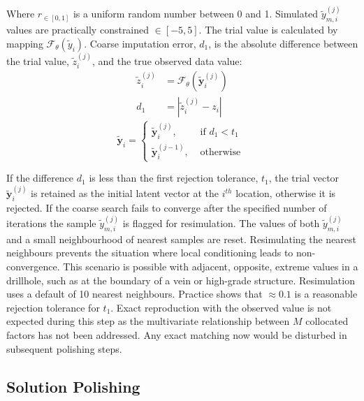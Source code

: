 Where $r_{\in[0,1]}$ is a uniform random number between 0 and 1. Simulated $\tilde{y}_{m, i}^{(j)}$ values are practically constrained $\in[-5, 5]$. The trial value is calculated by mapping $\mathcal{F}_{\theta}(\tilde{y}_{i})$. Coarse imputation error, $d_{1}$, is the absolute difference between the trial value, $\tilde{z}_{i}^{(j)}$, and the true observed data value:
\begin{align}
    \tilde{z}_{i}^{(j)} & = \mathcal{F}_{\theta}(\tilde{\mathbf{y}}_{i}^{(j)}) \\
    d_{1}               & = |\tilde{z}_{i}^{(j)} - z_{i}|
\end{align}
\begin{equation}
    \tilde{\mathbf{y}}_{i} =
    \begin{cases}
        \tilde{\mathbf{y}}_{i}^{(j)},   & \text{ if }d_{1} < t_{1} \\
        \tilde{\mathbf{y}}_{i}^{(j-1)}, & \text{ otherwise }
    \end{cases}
\end{equation}

If the difference $d_{1}$ is less than the first rejection tolerance, $t_{1}$, the trial vector $\tilde{\mathbf{y}}_{i}^{(j)}$ is retained as the initial latent vector at the $i^{th}$ location, otherwise it is rejected. If the coarse search fails to converge after the specified number of iterations the sample $\tilde{y}_{m, i}^{(j)}$ is flagged for resimulation. The values of both $\tilde{y}_{m, i}^{(j)}$ and a small neighbourhood of nearest samples are reset. Resimulating the nearest neighbours prevents the situation where local conditioning leads to non-convergence. This scenario is possible with adjacent, opposite, extreme values in a drillhole, such as at the boundary of a vein or high-grade structure. Resimulation uses a default of 10 nearest neighbours. Practice shows that $\approx 0.1$ is a reasonable rejection tolerance for $t_{1}$. Exact reproduction with the observed value is not expected during this step as the multivariate relationship between $M$ collocated factors has not been addressed. Any exact matching now would be disturbed in subsequent polishing steps.


\subsection{Solution Polishing}
\label{subsec:polish}


